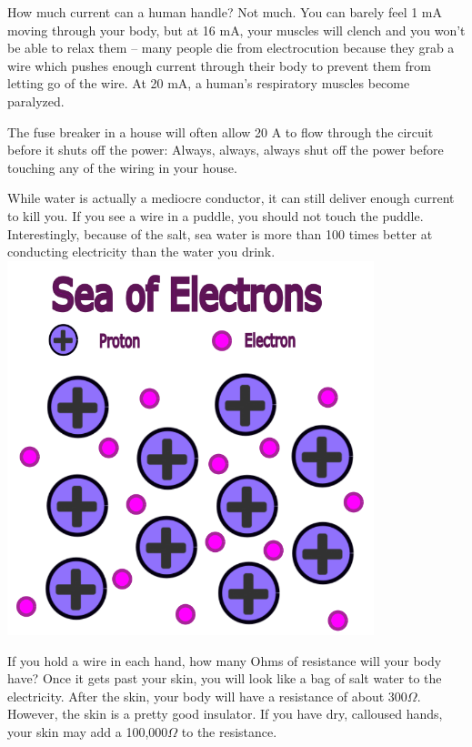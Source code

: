 How much current can a human handle? Not much. You can barely feel 1
mA moving through your body, but at 16 mA, your muscles will clench
and you won't be able to relax them -- many people die from
electrocution because they grab a wire which pushes enough current
through their body to prevent them from letting go of the wire.  At 20
mA, a human's respiratory muscles become paralyzed.

The fuse breaker in a house will often allow 20 A to flow through the
circuit before it shuts off the power: Always, always, always shut off
the power before touching any of the wiring in your house.

While water is actually a mediocre conductor, it can still deliver enough current
to kill you. If you see a wire in a puddle, you should not touch the
puddle. Interestingly, because of the salt, sea water is more than
100 times better at conducting electricity than the water you drink.
\includegraphics[width=0.8\textwidth]{Sea_Electrons.png}

If you hold a wire in each hand, how many Ohms of resistance will your
body have? Once it gets past your skin, you will look like a bag of
salt water to the electricity. After the skin, your body will have a
resistance of about 300$\Omega$. However, the skin is a pretty good
insulator. If you have dry, calloused hands, your skin may add a
100,000$\Omega$ to the resistance.


